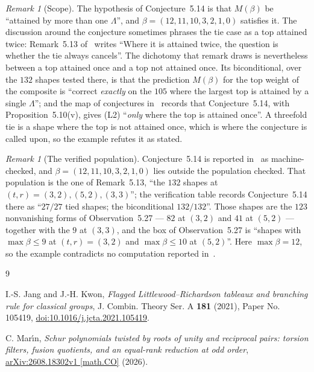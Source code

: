 \documentclass[11pt]{amsart}
\theoremstyle{remark}
\newtheorem{remark}[theorem]{Remark}
\begin{document}
\begin{remark}[Scope]
The hypothesis of Conjecture~5.14 is that $M(\beta)$ be ``attained by more
than one $\Lambda$'', and $\beta=(12,11,10,3,2,1,0)$ satisfies it. The
discussion around the conjecture sometimes phrases the tie case as a top
attained twice: Remark~5.13 of~\cite{Marin} writes ``Where it is attained
twice, the question is whether the tie always cancels''. The dichotomy that
remark draws is nevertheless between a top attained once and a top not
attained once. Its biconditional, over the $132$ shapes tested there, is
that the prediction $M(\beta)$ for the top weight of the composite is
``correct \emph{exactly} on the $105$ where the largest top is attained by
a single $\Lambda$''; and the map of conjectures in~\cite{Marin} records
that Conjecture~5.14, with Proposition~5.10(v), gives (L2) ``\emph{only}
where the top is attained once''. A threefold tie is a shape where the top
is not attained once, which is where the conjecture is called upon, so the
example refutes it as stated.
\end{remark}

\begin{remark}[The verified population]
Conjecture~5.14 is reported in~\cite{Marin} as machine-checked, and
$\beta=(12,11,10,3,2,1,0)$ lies outside the population checked. That
population is the one of Remark~5.13, ``the $132$ shapes at
$(t,r)=(3,2),(5,2),(3,3)$''; the verification table records
Conjecture~5.14 there as ``$27/27$ tied shapes; the biconditional
$132/132$''. Those shapes are the $123$
nonvanishing forms of Observation~5.27 --- $82$ at $(3,2)$ and $41$ at
$(5,2)$ --- together with the $9$ at $(3,3)$, and the box of
Observation~5.27 is ``shapes with $\max\beta\le9$ at $(t,r)=(3,2)$ and
$\max\beta\le10$ at $(5,2)$''. Here $\max\beta=12$, so the example
contradicts no computation reported in~\cite{Marin}.
\end{remark}

\begin{thebibliography}{9}

I.-S. Jang and J.-H. Kwon,
\emph{Flagged Littlewood--Richardson tableaux and branching rule for
classical groups},
J. Combin. Theory Ser. A \textbf{181} (2021),
Paper No. 105419,
\href{https://doi.org/10.1016/j.jcta.2021.105419}
{doi:10.1016/j.jcta.2021.105419}.

C. Mar\'\i n,
\emph{Schur polynomials twisted by roots of unity and reciprocal pairs:
torsion filters, fusion quotients, and an equal-rank reduction at odd
order},
\href{https://arxiv.org/abs/2608.18302v1}
{arXiv:2608.18302v1 [math.CO]} (2026).

\end{thebibliography}
\end{document}
